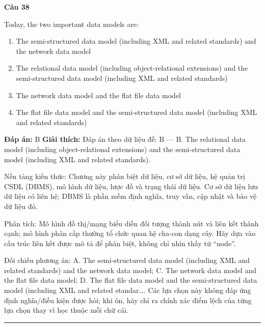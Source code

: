 \documentclass[11pt,a4paper]{article}
\newenvironment{question}[1]{%
  \par\vspace{1em}\noindent\textbf{\large Câu #1}\par\vspace{0.4em}
}{%
  \par\vspace{1em}\hrule\vspace{0.6em}
}
\newenvironment{choices}{%
  \begin{enumerate}[label=\textbf{\Alph*.},leftmargin=2.2em,itemsep=2pt,topsep=3pt]
}{%
  \end{enumerate}
}
\newcommand{\choice}{\item}
\begin{document}
\begin{question}{38}
Today, the two important data models are:
\begin{choices}
\choice The semi-structured data model (including XML and related standards) and the network data model
\choice The relational data model (including object-relational extensions) and the semi-structured data model (including XML and related standards)
\choice The network data model and the flat file data model
\choice The flat file data model and the semi-structured data model (including XML and related standards)
\end{choices}
\textbf{Đáp án:} B
\textbf{Giải thích:} Đáp án theo dữ liệu đề: B — B. The relational data model (including object-relational extensions) and the semi-structured data model (including XML and related standards).

Nền tảng kiến thức: Chương này phân biệt dữ liệu, cơ sở dữ liệu, hệ quản trị CSDL (DBMS), mô hình dữ liệu, lược đồ và trạng thái dữ liệu. Cơ sở dữ liệu lưu dữ liệu có liên hệ; DBMS là phần mềm định nghĩa, truy vấn, cập nhật và bảo vệ dữ liệu đó.

Phân tích: Mô hình đồ thị/mạng biểu diễn đối tượng thành nút và liên kết thành cạnh; mô hình phân cấp thường tổ chức quan hệ cha-con dạng cây. Hãy dựa vào cấu trúc liên kết được mô tả để phân biệt, không chỉ nhìn thấy từ “node”.

Đối chiếu phương án: A. The semi-structured data model (including XML and related standards) and the network data model; C. The network data model and the flat file data model; D. The flat file data model and the semi-structured data model (including XML and related standar…. Các lựa chọn này không đáp ứng định nghĩa/điều kiện được hỏi; khi ôn, hãy chỉ ra chính xác điểm lệch của từng lựa chọn thay vì học thuộc mỗi chữ cái.
\end{question}
\end{document}

